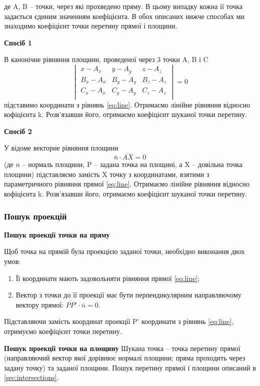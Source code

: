 \documentclass[a4paper,12pt]{article}
\begin{document}
де A, B -- точки, через які прохведено пряму. В цьому випадку кожна її точка задається єдиним значенням коефіцієнта. В обох описаних нижче способах ми знаходимо коефіцієнт точки перетину прямої і площини.

\textbf{Спосіб 1}

В канонічне рівняння площини, проведеної через 3 точки A, B і C
\begin{equation} \label{eq:plane}
  \begin{vmatrix}
    x - A_x & y - A_y & z - A_z \\
    B_x - A_x & B_y - A_y & B_z - A_z \\
    C_x - A_x & C_y - A_y & C_z - A_z \\
  \end{vmatrix} = 0
\end{equation}
підставимо координати з рівнянь \ref{eq:line}. Отримаємо лінійне рівняння відносно кофіцієнта k. Розв’язавши його, отримаємо коефіцієнт шуканої точки перетину.

\textbf{Спосіб 2}

У відоме векторне рівняння площини
\begin{equation} \label{eq:plane-vector}
  \bar n \cdot \overline{AX} = 0
\end{equation}
(де $\bar n$ -- нормаль площини, P -- задана точка на площині, а X -- довільна точка площини) підставляємо замість X точку з координатами, взятими з параметричного рівняння прямої \ref{eq:line}. Отримаємо лінійне рівняння відносно кофіцієнта k. Розв’язавши його, отримаємо коефіцієнт шуканої точки перетину.

\subsubsection{Пошук проекцій} \label{sec:projections}
\textbf{Пошук проекції точки на пряму}

Щоб точка на прямій була проекцією заданої точки, необхідно виконання двох умов:
\begin{enumerate}
  \item Її координати мають задовольняти рівняння прямої \ref{eq:line};
  \item Вектор з точки до її проекції має бути перпендикулярним направляючому вектору прямої: $\overline{PP'} \cdot \bar n = 0$.
\end{enumerate}
Підставляючи замість координат проекції P' координати з рівнянь \ref{eq:line}, отримуємо коефіцієнт точки перетину.

\textbf{Пошук проекції точки на площину}
Шукана точка -- точка перетину прямої (направляючий вектор якої дорівнює нормалі площини; пряма проходить через задану точку) та заданої площини. Пошук перетину прямої і площини описаний в \ref{sec:intersections}.
\end{document}
